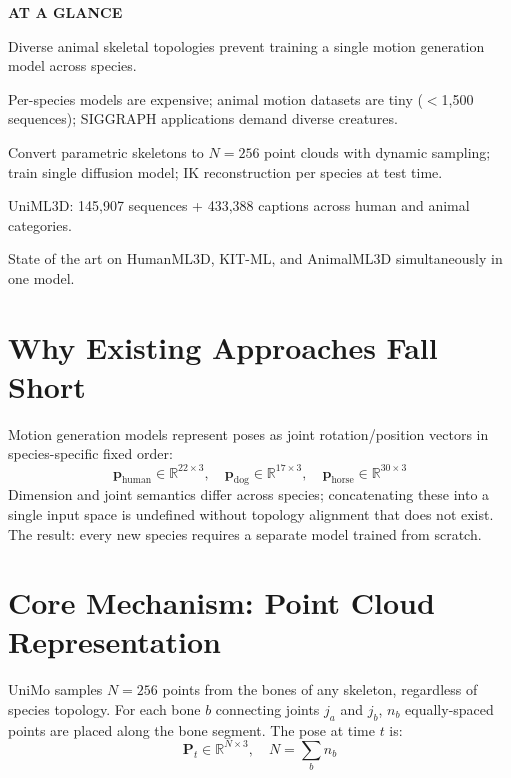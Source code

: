 \documentclass[10pt,twocolumn]{article}
\begin{document}
\begin{mdframed}[backgroundcolor=boxgray,linecolor=rulered,linewidth=1pt,
    innerleftmargin=6pt,innerrightmargin=6pt,
    innertopmargin=6pt,innerbottommargin=6pt]
\textbf{\small AT A GLANCE}\par\vspace{4pt}
\begin{description}[leftmargin=0pt,labelsep=4pt,itemsep=2pt,parsep=0pt,
    font=\small\bfseries]
  \item[Problem:] Diverse animal skeletal topologies prevent training
    a single motion generation model across species.
  \item[Why it matters:] Per-species models are expensive; animal
    motion datasets are tiny ($<$1,500 sequences); SIGGRAPH
    applications demand diverse creatures.
  \item[Method:] Convert parametric skeletons to $N=256$ point clouds
    with dynamic sampling; train single diffusion model; IK
    reconstruction per species at test time.
  \item[Dataset:] UniML3D: 145,907 sequences + 433,388 captions
    across human and animal categories.
  \item[Result:] State of the art on HumanML3D, KIT-ML, and
    AnimalML3D simultaneously in one model.
\end{description}
\end{mdframed}

\section{Why Existing Approaches Fall Short}

Motion generation models represent poses as joint rotation/position
vectors in species-specific fixed order:
\[
  \mathbf{p}_\text{human} \in \mathbb{R}^{22 \times 3}, \quad
  \mathbf{p}_\text{dog} \in \mathbb{R}^{17 \times 3}, \quad
  \mathbf{p}_\text{horse} \in \mathbb{R}^{30 \times 3}
\]
Dimension and joint semantics differ across species; concatenating
these into a single input space is undefined without topology alignment
that does not exist. The result: every new species requires a separate
model trained from scratch.

\section{Core Mechanism: Point Cloud Representation}

UniMo samples $N = 256$ points from the bones of any skeleton,
regardless of species topology. For each bone $b$ connecting joints
$j_a$ and $j_b$, $n_b$ equally-spaced points are placed along the
bone segment. The pose at time $t$ is:
\[
  \mathbf{P}_t \in \mathbb{R}^{N \times 3}, \quad N = \sum_b n_b
\]
\end{document}
